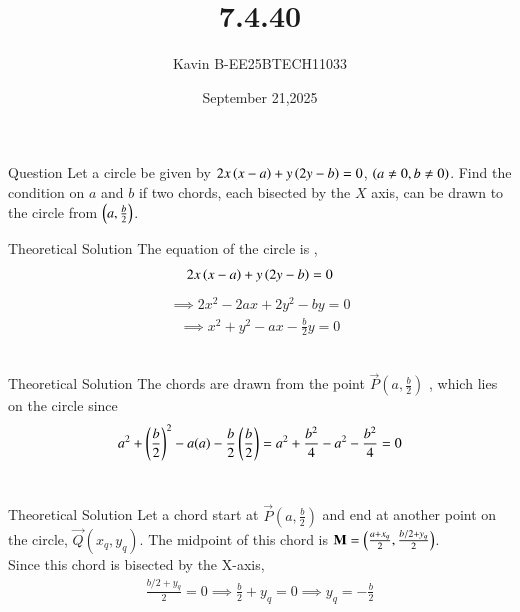 \documentclass{beamer}
\begin{document}
\title 
{7.4.40}
\date{September 21,2025}


\author 
{Kavin B-EE25BTECH11033}






\frame{\titlepage}
\begin{frame}{Question}
Let a circle be given by $2x\left(x-a\right)+y\left(2y-b\right)=0$, $\left(a\neq0, b\neq0\right)$. Find the condition on $a$ and $b$ if two chords,  each bisected by the $X$ axis, can be drawn to the circle from $\left(a, \frac{b}{2}\right)$.\\  
\bigskip
\end{frame}



\begin{frame}{Theoretical Solution}
The equation of the circle is ,
\begin{align}
    2x\left(x-a\right)+y\left(2y-b\right)=0
\end{align}
\begin{align}
    \implies2x^2 - 2ax + 2y^2 - by = 0
\end{align}
\begin{align}
    \implies x^2 + y^2 - ax - \frac{b}{2}y = 0
\end{align}\\
\bigskip
\end{frame}

\begin{frame}{Theoretical Solution}
The chords are drawn from the point $\vec{P}(a, \frac{b}{2})$ , which lies on the circle since\\
\begin{align}
a^2 + \left(\frac{b}{2}\right)^2 - a(a) - \frac{b}{2}\left(\frac{b}{2}\right) = a^2 + \frac{b^2}{4} - a^2 - \frac{b^2}{4} = 0
\end{align}\\

\end{frame}


\begin{frame}{Theoretical Solution}
Let a chord start at $\vec{P}(a, \frac{b}{2})$ and end at another point on the circle, $\vec{Q}(x_q, y_q)$. The midpoint of this chord is $\mathbf{M} = \left(\frac{a+x_q}{2}, \frac{b/2+y_q}{2}\right)$.\\ 

Since this chord is bisected by the X-axis,
\begin{align}
\frac{b/2+y_q}{2} = 0 \implies \frac{b}{2} + y_q = 0 \implies y_q = -\frac{b}{2}
\end{align}
\end{frame}
\end{document}

